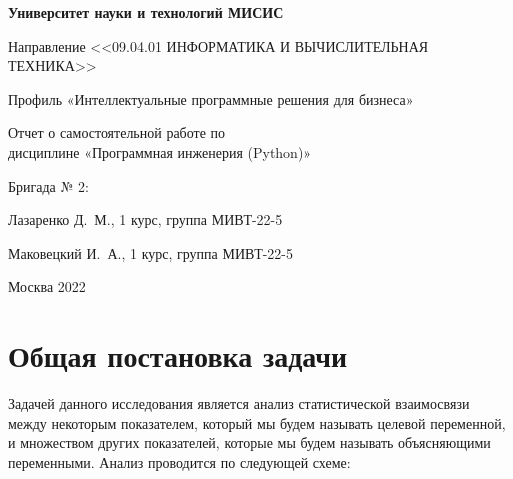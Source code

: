 \documentclass[12pt]{article}
\begin{document}
\pagestyle{empty}
\begin{center} \textbf{Университет науки и технологий МИСИС}

  Направление <<09.04.01 ИНФОРМАТИКА И ВЫЧИСЛИТЕЛЬНАЯ ТЕХНИКА>>

  Профиль «Интеллектуальные программные решения для бизнеса»

  \vspace{1.0cm}
  Отчет о самостоятельной работе по \\ дисциплине «Программная инженерия (Python)»

\end{center}

\vspace{10.0cm}
\begin{flushright}
{Бригада № 2}:

Лазаренко Д.~М., 1 курс, группа МИВТ-22-5

Маковецкий И.~А., 1 курс, группа МИВТ-22-5

\end{flushright}

\vspace*{\fill}

\begin{center}
Москва 2022
\end{center}

\newpage
\pagestyle{plain}
\renewcommand{\contentsname}{Оглавление}
\tableofcontents
\newpage
\section{Общая постановка задачи}
Задачей данного исследования является анализ статистической взаимосвязи между некоторым показателем, который мы будем называть целевой переменной, и множеством других показателей, которые мы будем называть объясняющими переменными. Анализ проводится по следующей схеме:
\end{document}
